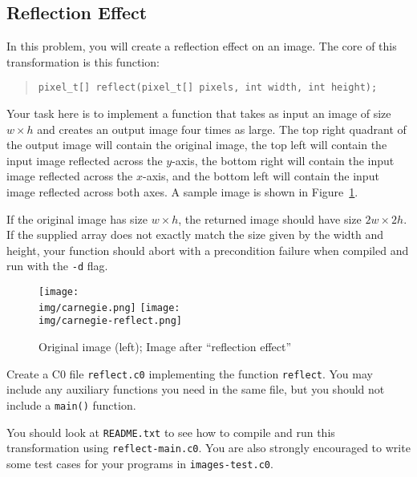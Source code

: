 \subsection{Reflection Effect}
\label{sect:reflect}

In this problem, you will create a reflection effect on an image.
The core of this transformation is this function:
\begin{quote}
\begin{lstlisting}
pixel_t[] reflect(pixel_t[] pixels, int width, int height);
\end{lstlisting}
\end{quote}
Your task here is to implement a function that takes as input an image
of size $w \times h$ and creates an output image four times as large.
The top right quadrant of the output image will contain the original
image, the top left will contain the input image reflected across the
$y$-axis, the bottom right will contain the input image reflected across
the $x$-axis, and the bottom left will contain the input image reflected
across both axes.  A sample image is shown in
Figure~\ref{fig:carnegie-reflect}.

If the original image has size $w \times h$, the returned image should
have size $2w \times 2h$. If the supplied array does not exactly match
the size given by the width and height, your function should abort with
a precondition failure when compiled and run with the \lstinline'-d' flag.

\begin{figure}
\centering
\texttt{[image: \\img/carnegie.png]}
\quad\quad
\texttt{[image: \\img/carnegie-reflect.png]}
\caption{Original image (left); Image after ``reflection effect''}
\label{fig:carnegie-reflect}
\end{figure}

\vspace{0.1in}

\begin{task}[8]
  Create a C0 file \lstinline'reflect.c0' implementing the function
  \lstinline'reflect'. You may include any auxiliary functions you need in the
  same file, but you should not include a \lstinline'main()' function.
\end{task}

You should look at \lstinline'README.txt' to see how to compile and run
this transformation using \lstinline'reflect-main.c0'. You are also
strongly encouraged to write some test cases for your
programs in \lstinline'images-test.c0'.


